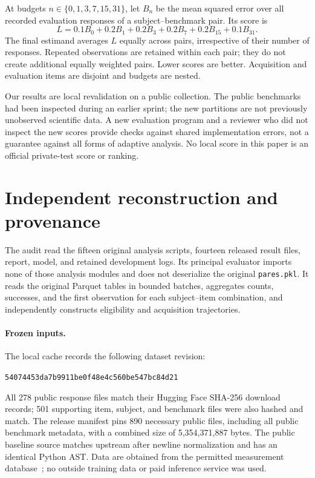 \documentclass{article}
\begin{document}
At budgets $n\in\{0,1,3,7,15,31\}$, let $B_n$ be the mean squared error over
all recorded evaluation responses of a subject--benchmark pair. Its score is
\begin{equation}
 L=0.1B_0+0.2B_1+0.2B_3+0.2B_7+0.2B_{15}+0.1B_{31}.
\end{equation}
The final estimand averages $L$ equally across pairs, irrespective of their
number of responses. Repeated observations are retained within each pair;
they do not create additional equally weighted pairs. Lower scores are better.
Acquisition and evaluation items are disjoint and budgets are nested.

Our results are local revalidation on a public collection. The public
benchmarks had been inspected during an earlier sprint; the new partitions
are not previously unobserved scientific data. A new evaluation program and
a reviewer who did not inspect the new scores provide checks against shared
implementation errors, not a guarantee against all forms of adaptive analysis.
No local score in this paper is an official private-test score or ranking.

\section{Independent reconstruction and provenance}
The audit read the fifteen original analysis scripts, fourteen released
result files, report, model, and retained development logs. Its principal
evaluator imports none of those analysis modules and does not deserialize
the original \texttt{pares.pkl}. It reads the original Parquet tables in
bounded batches, aggregates counts, successes, and the first observation
for each subject--item combination, and independently constructs eligibility
and acquisition trajectories.

\paragraph{Frozen inputs.}
The local cache records the following dataset revision:
\begin{center}\small
\texttt{54074453da7b9911be0f48e4c560be547bc84d21}
\end{center}
All 278 public response
files match their Hugging Face SHA-256 download records; 501 supporting item,
subject, and benchmark files were also hashed and match. The release manifest
pins 890 necessary public files, including all public benchmark metadata,
with a combined size of 5,354,371,887 bytes. The public baseline source
matches upstream after newline normalization and has an identical Python AST.
Data are obtained from the permitted measurement database~\cite{data}; no
outside training data or paid inference service was used.
\end{document}
